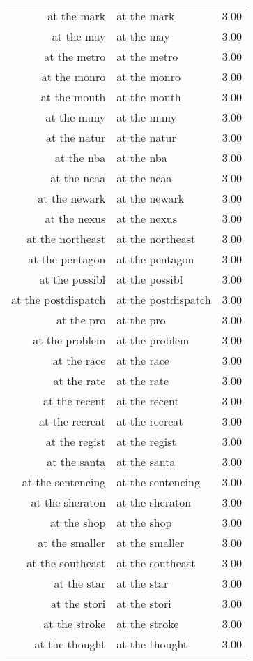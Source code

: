 \begin{table}[ht]
\begin{tabular}{rlr}
  at the mark & at the mark & 3.00 \\ 
  at the may & at the may & 3.00 \\ 
  at the metro & at the metro & 3.00 \\ 
  at the monro & at the monro & 3.00 \\ 
  at the mouth & at the mouth & 3.00 \\ 
  at the muny & at the muny & 3.00 \\ 
  at the natur & at the natur & 3.00 \\ 
  at the nba & at the nba & 3.00 \\ 
  at the ncaa & at the ncaa & 3.00 \\ 
  at the newark & at the newark & 3.00 \\ 
  at the nexus & at the nexus & 3.00 \\ 
  at the northeast & at the northeast & 3.00 \\ 
  at the pentagon & at the pentagon & 3.00 \\ 
  at the possibl & at the possibl & 3.00 \\ 
  at the postdispatch & at the postdispatch & 3.00 \\ 
  at the pro & at the pro & 3.00 \\ 
  at the problem & at the problem & 3.00 \\ 
  at the race & at the race & 3.00 \\ 
  at the rate & at the rate & 3.00 \\ 
  at the recent & at the recent & 3.00 \\ 
  at the recreat & at the recreat & 3.00 \\ 
  at the regist & at the regist & 3.00 \\ 
  at the santa & at the santa & 3.00 \\ 
  at the sentencing & at the sentencing & 3.00 \\ 
  at the sheraton & at the sheraton & 3.00 \\ 
  at the shop & at the shop & 3.00 \\ 
  at the smaller & at the smaller & 3.00 \\ 
  at the southeast & at the southeast & 3.00 \\ 
  at the star & at the star & 3.00 \\ 
  at the stori & at the stori & 3.00 \\ 
  at the stroke & at the stroke & 3.00 \\ 
  at the thought & at the thought & 3.00 \\ 

\end{tabular}
\end{table}
